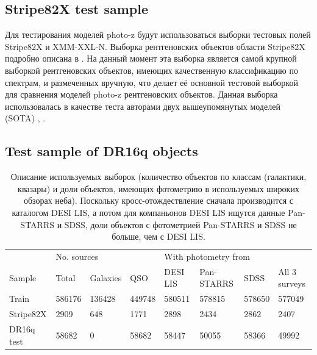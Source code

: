 \documentclass[fleqn,usenatbib]{mnras}
\begin{document}
\subsection{Stripe82X test sample}
Для тестирования моделей photo-z будут использоваться выборки тестовых полей Stripe82X и XMM-XXL-N. Выборка рентгеновских объектов области Stripe82X подробно описана в \cite{bib:ananna2017}. На данный момент эта выборка является самой крупной выборкой рентгеновских объектов, имеющих качественную классификацию по спектрам, и размеченных вручную, что делает её основной тестовой выборкой для сравнения моделей photo-z рентгеновских объектов. Данная выборка использовалась в качестве теста авторами двух вышеупомянутых моделей (SOTA) \cite{bib:ananna2017}, \cite{bib:brescia2018}. 
\subsection{Test sample of DR16q objects}
\begin{table}
	\begin{tabular}{llllllll}
            \hline
            {}           & \multicolumn{3}{l}{No. sources}      & \multicolumn{4}{l}{With photometry from}  \\
             Sample      &       Total &     Galaxies &     QSO & DESI LIS & Pan-STARRS &    SDSS & All 3 surveys \\
            \hline
            Train        &      586176 &       136428 &  449748 &   580511 &     578815 &  578650 &  577049 \\
            Stripe82X    &        2909 &          648 &    1771 &     2898 &       2434 &    2862 &    2407 \\
            DR16q test   &       58682 &            0 &   58682 &    58447 &      50055 &   58366 &   49992 \\
            \hline
            \end{tabular}
            \caption{Описание используемых выборок (количество объектов по классам (галактики, квазары) и доли объектов, имеющих фотометрию в используемых широких обзорах неба). Поскольку кросс-отождествление сначала производится с каталогом DESI LIS, а потом для компаньонов DESI LIS ищутся данные Pan-STARRS и SDSS, доли объектов с фотометрией Pan-STARRS и SDSS не больше, чем с DESI LIS.}
\end{table}
\end{document}
